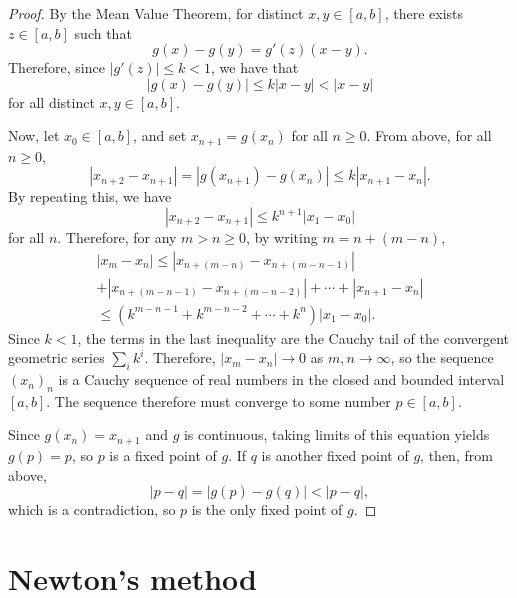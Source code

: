 \documentclass{article}
\theoremstyle{plain}
\begin{document}
\begin{proof}
  By the Mean Value Theorem, for distinct $x,y \in [a,b]$, there exists $z \in [a,b]$ such that
  \begin{equation}
    g(x) - g(y) = g'(z)(x-y).
  \end{equation}
  Therefore, since $|g'(z)| \leq k < 1$, we have that
  \begin{equation}
    |g(x) - g(y)| \leq k|x-y| < |x-y|
  \end{equation}
  for all distinct $x,y \in [a,b]$.

  Now, let $x_0 \in [a,b]$, and set $x_{n+1} = g(x_n)$ for all $n \geq 0$.
  From above, for all $n \geq 0$,
  \begin{equation}
    |x_{n+2} - x_{n+1}| = |g(x_{n+1}) - g(x_n)| \leq k |x_{n+1} - x_n|.
  \end{equation}
  By repeating this, we have
  \begin{equation}
    |x_{n+2} - x_{n+1}| \leq k^{n+1} |x_1 - x_0|
  \end{equation}
  for all $n$.
  Therefore, for any $m > n \geq 0$, by writing $m = n + (m-n)$,
  \begin{multline}
      |x_m - x_n| \leq |x_{n + (m-n)} - x_{n + (m-n-1)}| \\
      + |x_{n + (m-n-1)} - x_{n + (m-n-2)}| + \cdots + |x_{n+1} - x_n| \\
      \leq (k^{m-n-1} + k^{m-n-2} + \cdots + k^n)|x_1 - x_0|.
  \end{multline}
  Since $k < 1$, the terms in the last inequality are the Cauchy tail of the convergent geometric series $\sum_i k^i$.
  Therefore, $|x_m - x_n| \to 0$ as $m, n \to \infty$, so the sequence $(x_n)_n$ is a Cauchy sequence of real numbers in the closed and bounded interval $[a,b]$.
  The sequence therefore must converge to some number $p \in [a,b]$.

  Since $g(x_n) = x_{n+1}$ and $g$ is continuous, taking limits of this equation yields $g(p) = p$, so $p$ is a fixed point of $g$.
  If $q$ is another fixed point of $g$, then, from above,
  \begin{equation}
    |p-q| = |g(p) - g(q)| < |p-q|,
  \end{equation}
  which is a contradiction, so $p$ is the only fixed point of $g$.
\end{proof}

\section{Newton's method}
\end{document}
